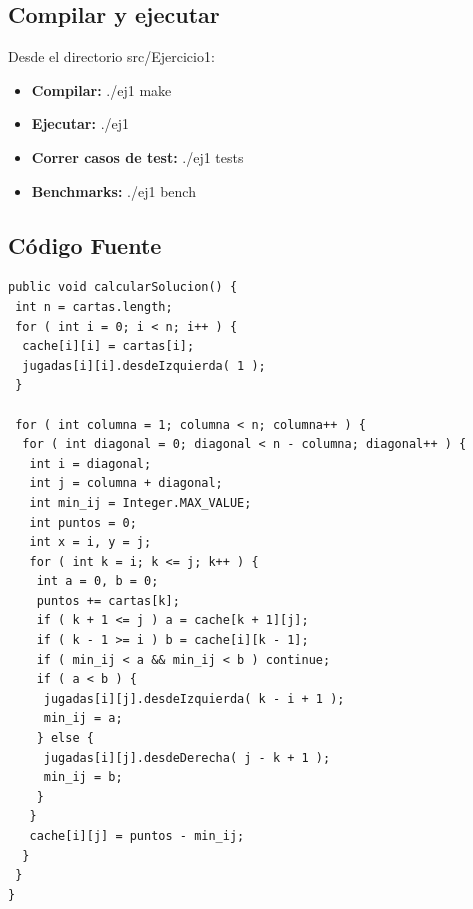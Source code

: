 \subsection{Compilar y ejecutar}
Desde el directorio src/Ejercicio1:
\begin{itemize}
   \item {\bf Compilar:} ./ej1 make
   \item {\bf Ejecutar:} ./ej1
   \item {\bf Correr casos de test:} ./ej1 tests
   \item {\bf Benchmarks:} ./ej1 bench
\end{itemize}

\subsection{C\'odigo Fuente}
\begin{verbatim}
public void calcularSolucion() {
 int n = cartas.length;
 for ( int i = 0; i < n; i++ ) {
  cache[i][i] = cartas[i];
  jugadas[i][i].desdeIzquierda( 1 );
 }

 for ( int columna = 1; columna < n; columna++ ) {
  for ( int diagonal = 0; diagonal < n - columna; diagonal++ ) {
   int i = diagonal;
   int j = columna + diagonal;
   int min_ij = Integer.MAX_VALUE;
   int puntos = 0;
   int x = i, y = j;
   for ( int k = i; k <= j; k++ ) {
    int a = 0, b = 0;
    puntos += cartas[k];
    if ( k + 1 <= j ) a = cache[k + 1][j];
    if ( k - 1 >= i ) b = cache[i][k - 1];
    if ( min_ij < a && min_ij < b ) continue;
    if ( a < b ) {
     jugadas[i][j].desdeIzquierda( k - i + 1 );
     min_ij = a;
    } else {
     jugadas[i][j].desdeDerecha( j - k + 1 );
     min_ij = b;
    }
   }
   cache[i][j] = puntos - min_ij;
  }
 }
}
\end{verbatim}
